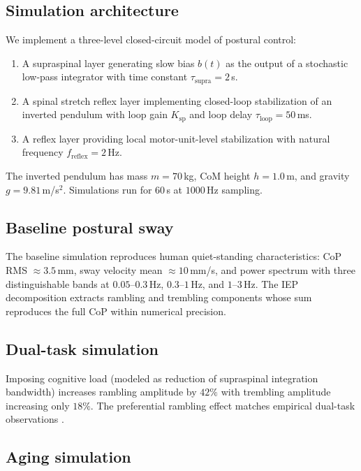 \documentclass[11pt,twocolumn,a4paper]{article}
\theoremstyle{definition}
\theoremstyle{remark}
\begin{document}
\subsection{Simulation architecture}

We implement a three-level closed-circuit model of postural
control:
\begin{enumerate}[label=(\roman*),leftmargin=*,itemsep=1pt]
\item A supraspinal layer generating slow bias $b(t)$ as the
output of a stochastic low-pass integrator with time constant
$\tau_{\mathrm{supra}} = 2$\,s.
\item A spinal stretch reflex layer implementing closed-loop
stabilization of an inverted pendulum with loop gain $K_{\mathrm{sp}}$
and loop delay $\tau_{\mathrm{loop}} = 50$\,ms.
\item A reflex layer providing local motor-unit-level stabilization
with natural frequency $f_{\mathrm{reflex}} = 2$\,Hz.
\end{enumerate}
The inverted pendulum has mass $m = 70$\,kg, CoM height
$h = 1.0$\,m, and gravity $g = 9.81$\,m/s$^2$. Simulations run
for $60$\,s at $1000$\,Hz sampling.

\subsection{Baseline postural sway}

The baseline simulation reproduces human quiet-standing
characteristics: CoP RMS $\approx 3.5$\,mm, sway velocity mean
$\approx 10$\,mm/s, and power spectrum with three distinguishable
bands at $0.05$--$0.3$\,Hz, $0.3$--$1$\,Hz, and $1$--$3$\,Hz. The
IEP decomposition extracts rambling and trembling components whose
sum reproduces the full CoP within numerical precision.

\subsection{Dual-task simulation}

Imposing cognitive load (modeled as reduction of supraspinal
integration bandwidth) increases rambling amplitude by $42\%$ with
trembling amplitude increasing only $18\%$. The preferential
rambling effect matches empirical dual-task observations
\citep{lajoie1993,pellecchia2003}.

\subsection{Aging simulation}
\end{document}
